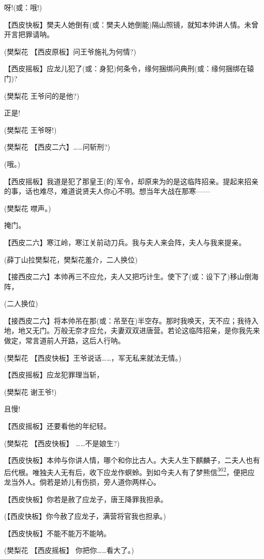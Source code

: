 呀!(或：哦!)

【西皮快板】樊夫人她倒有(或：樊夫人她倒能)隔山照镜，就知本帅讲人情。未曾开言把罪请呐。

(樊梨花 【西皮原板】问王爷施礼为何情?)

【西皮摇板】应龙儿犯了(或：身犯)何条令，缘何捆绑问典刑(或：缘何捆绑在辕门)?

(樊梨花 王爷问的是他?)

正是!

(樊梨花 王爷呀!)

(樊梨花 【西皮二六】\ldots{}\ldots{}问斩刑?)

(哦。)

【西皮摇板】我道是犯了那皇王(的)军令，却原来为的是这临阵招亲。提起来招亲的事，话也难尽，难道说贤夫人你心不明。想当年大战在那寒------

(樊梨花 噤声。)

掩门。

【西皮二六】寒江岭，寒江关前动刀兵。我与夫人来会阵，夫人与我来提亲。

(薛丁山拉樊梨花，樊梨花羞介，二人换位)

【接西皮二六】本帅再三不应允，夫人又把巧计生。使下了(或：设下了)移山倒海阵，

(二人换位)

【接西皮二六】将本帅吊在那(或：吊至在)半空存。那时我唤天，天不应；我待入地，地又无门。万般无奈才应允，夫妻双双进唐营。若论这临阵招亲，是你我先来做定，常言道前人开路，这后人行呐。

(樊梨花 【西皮快板】王爷说话\ldots{}\ldots{}，军无私来就法无情。)

【西皮摇板】应龙犯罪理当斩，

(樊梨花 谢王爷!)

且慢!

【西皮摇板】还要看他的年纪轻。

(樊梨花 【西皮快板】 \ldots{}\ldots{}不是娘生?)

【西皮快板】本帅与你讲人情，哪个和你比古人。大夫人生下麒麟子，二夫人也有后代根。唯独夫人无有后，收下应龙作螟蛉。到如今夫人有了梦熊信\protect\hyperlink{fn362}{\textsuperscript{362}}，便把应龙当外人。倘若是娇儿有伤损，旁人道你两样心。

【西皮快板】你若是赦了应龙子，唐王降罪我担承。

(【西皮快板】你今赦了应龙子，满营将官我也担承。)

【西皮快板】不能不能万不能呐。

(樊梨花 【西皮摇板】 你把你\ldots{}\ldots{}看大了。)

